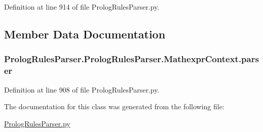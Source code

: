 Definition at line 914 of file Prolog\+Rules\+Parser.\+py.



\subsection{Member Data Documentation}
\hypertarget{class_prolog_rules_parser_1_1_prolog_rules_parser_1_1_mathexpr_context_ac8dc4d30ca3371198e7bb5db972832b8}{}
\subsubsection[{parser}]{\setlength{\rightskip}{0pt plus 5cm}Prolog\+Rules\+Parser.\+Prolog\+Rules\+Parser.\+Mathexpr\+Context.\+parser}\label{class_prolog_rules_parser_1_1_prolog_rules_parser_1_1_mathexpr_context_ac8dc4d30ca3371198e7bb5db972832b8}


Definition at line 908 of file Prolog\+Rules\+Parser.\+py.



The documentation for this class was generated from the following file\+:\begin{DoxyCompactItemize}
\item 
\hyperlink{_prolog_rules_parser_8py}{Prolog\+Rules\+Parser.\+py}\end{DoxyCompactItemize}
